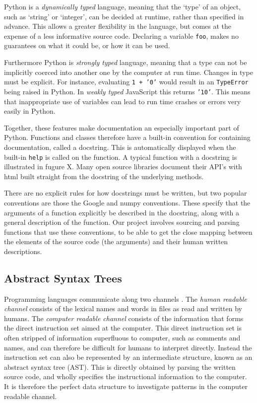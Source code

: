 Python is a \textit{dynamically typed} language, meaning that the `type' of an object, such as `string' or `integer', can be decided at runtime, rather than specified in advance.
This allows a greater flexibility in the language, but comes at the expense of a less informative source code.
Declaring a variable \texttt{foo}, makes no guarantees on what it could be, or how it can be used. 

Furthermore Python is \textit{strongly typed} language, meaning that a type can not be implicitly coerced into another one by the computer at run time. Changes in type must be explicit. For instance, evaluating \texttt{1 + '0'} would result in an \texttt{TypeError} being raised in Python. In \textit{weakly typed} JavaScript this returns \texttt{'10'}.
This means that inappropriate use of variables can lead to run time crashes or errors very easily in Python.

Together, these features make documentation an especially important part of Python. 
Functions and classes therefore have a built-in convention for containing documentation, called a docstring. 
This is automatically displayed when the built-in \texttt{help} is called on the function.
A typical function with a docstring is illustrated in fugure X. 
Many open source libraries document their API's with html built straight from the docstring of the underlying methods.

There are no explicit rules for how docstrings must be written, but two popular conventions are those the Google and numpy conventions. These specify that the arguments of a function explicitly be described in the docstring, along with a general description of the function.
Our project involves sourcing and parsing functions that use these conventions, to be able to get the close mapping between the elements of the source code (the arguments) and their human written descriptions. 


\subsection{Abstract Syntax Trees} %
\label{sub:abstract_syntax_trees}

Programming languages communicate along two channels \citep{allamanis_survey_2017}. The \textit{human readable channel} consists of the lexical names and words in files as read and written by humans.  The \textit{computer readable channel} consists of the information that forms the direct instruction set aimed at the computer.
This direct instruction set is often stripped of information superfluous to computer, such as comments and names, and can therefore be difficult for humans to interpret directly.
Instead the instruction set can also be represented by an intermediate structure, known as an abstract syntax tree (AST).
This is directly obtained by parsing the written source code, and wholly specifies the instructional information to the computer.
It is therefore the perfect data structure to investigate patterns in the computer readable channel.

